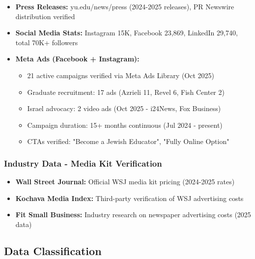 \documentclass[12pt,letterpaper]{article}
\begin{document}
\begin{itemize}[leftmargin=*]
\begin{itemize}
        \item YU Innovation Lab: Channel confirmed (May 2019 launch verified)
    \end{itemize}
    \item \textbf{Press Releases:} yu.edu/news/press (2024-2025 releases), PR Newswire distribution verified
    \item \textbf{Social Media Stats:} Instagram 15K, Facebook 23,869, LinkedIn 29,740, total 70K+ followers
    \item \textbf{Meta Ads (Facebook + Instagram):}
    \begin{itemize}
        \item 21 active campaigns verified via Meta Ads Library (Oct 2025)
        \item Graduate recruitment: 17 ads (Azrieli 11, Revel 6, Fish Center 2)
        \item Israel advocacy: 2 video ads (Oct 2025 - i24News, Fox Business)
        \item Campaign duration: 15+ months continuous (Jul 2024 - present)
        \item CTAs verified: "Become a Jewish Educator", "Fully Online Option"
    \end{itemize}
\end{itemize}

\subsubsection{Industry Data - Media Kit Verification}
\begin{itemize}[leftmargin=*]
    \item \textbf{Wall Street Journal:} Official WSJ media kit pricing (2024-2025 rates)
    \item \textbf{Kochava Media Index:} Third-party verification of WSJ advertising costs
    \item \textbf{Fit Small Business:} Industry research on newspaper advertising costs (2025 data)
\end{itemize}

\subsection{Data Classification}
\end{document}

